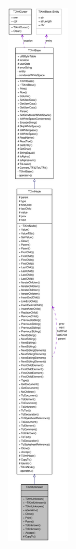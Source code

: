 \begin{figure}[H]
\begin{center}
\leavevmode
\includegraphics[height=400pt]{class_ti_xml_unknown__coll__graph}
\end{center}
\end{figure}
